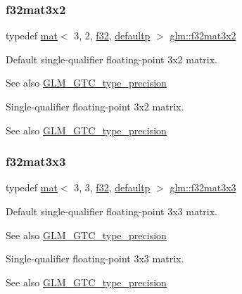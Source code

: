 \subsubsection{\texorpdfstring{f32mat3x2}{f32mat3x2}}
{\footnotesize\ttfamily typedef \hyperlink{structglm_1_1mat}{mat}$<$ 3, 2, \hyperlink{group__gtc__type__precision_ga0ec999b57f5330d9021256e96038df04}{f32}, \hyperlink{namespaceglm_a36ed105b07c7746804d7fdc7cc90ff25a9d21ccd8b5a009ec7eb7677befc3bf51}{defaultp} $>$ \hyperlink{group__gtc__type__precision_ga924b933089d954df062aa8d0735fc005}{glm\+::f32mat3x2}}

Default single-\/qualifier floating-\/point 3x2 matrix. \begin{DoxySeeAlso}{See also}
\hyperlink{group__gtc__type__precision}{G\+L\+M\+\_\+\+G\+T\+C\+\_\+type\+\_\+precision}
\end{DoxySeeAlso}
Single-\/qualifier floating-\/point 3x2 matrix. \begin{DoxySeeAlso}{See also}
\hyperlink{group__gtc__type__precision}{G\+L\+M\+\_\+\+G\+T\+C\+\_\+type\+\_\+precision} 
\end{DoxySeeAlso}
\mbox{\label{group__gtc__type__precision_ga177c076d6d9aea27a5ae87b52607e57a}} 
\subsubsection{\texorpdfstring{f32mat3x3}{f32mat3x3}}
{\footnotesize\ttfamily typedef \hyperlink{structglm_1_1mat}{mat}$<$ 3, 3, \hyperlink{group__gtc__type__precision_ga0ec999b57f5330d9021256e96038df04}{f32}, \hyperlink{namespaceglm_a36ed105b07c7746804d7fdc7cc90ff25a9d21ccd8b5a009ec7eb7677befc3bf51}{defaultp} $>$ \hyperlink{group__gtc__type__precision_ga177c076d6d9aea27a5ae87b52607e57a}{glm\+::f32mat3x3}}

Default single-\/qualifier floating-\/point 3x3 matrix. \begin{DoxySeeAlso}{See also}
\hyperlink{group__gtc__type__precision}{G\+L\+M\+\_\+\+G\+T\+C\+\_\+type\+\_\+precision}
\end{DoxySeeAlso}
Single-\/qualifier floating-\/point 3x3 matrix. \begin{DoxySeeAlso}{See also}
\hyperlink{group__gtc__type__precision}{G\+L\+M\+\_\+\+G\+T\+C\+\_\+type\+\_\+precision} 
\end{DoxySeeAlso}
\mbox{\label{group__gtc__type__precision_ga8459d79e94eb107e31f0ee600e9bae3f}} 
